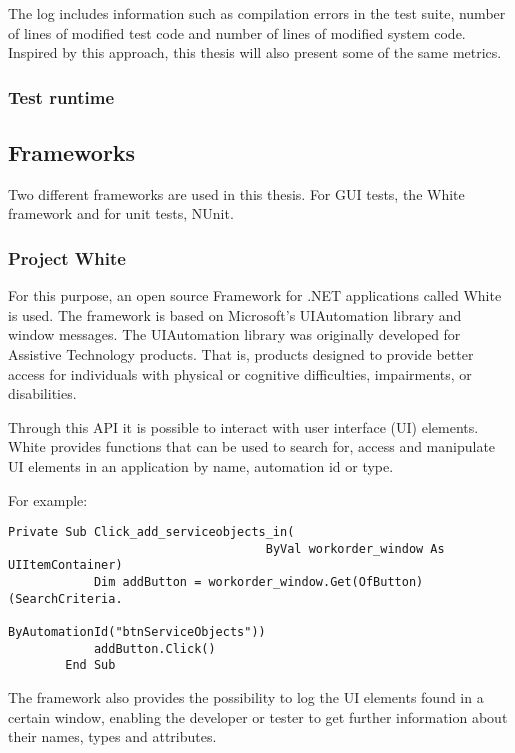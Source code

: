 \documentclass{article}
\begin{document}
			The log includes information such as compilation errors in the test
			suite, number of lines of modified test code and number of lines of modified system code. Inspired by this approach, this thesis will also present some of the same metrics.

			\subsubsection{Test runtime}


		\subsection{Frameworks}

			Two different frameworks are used in this thesis. For GUI tests, the White framework and for unit tests, NUnit. 

			\subsubsection{Project White}
			For this purpose, an open source Framework for .NET applications called White is used. The framework is based on Microsoft's UIAutomation library and window messages. The UIAutomation library was originally developed for Assistive Technology products. That is, products designed to provide better access for individuals with physical or cognitive difficulties, impairments, or disabilities. \cite{white}

			Through this API it is possible to interact with user interface (UI) elements. 
			White provides functions that can be used to search for, access and manipulate UI elements in an application by name, automation id or type. 

			For example:

			\begin{lstlisting}[caption=A method which finds a button with id {\em btnServiceObjects} and clicks on it.]
		Private Sub Click_add_serviceobjects_in(
									ByVal workorder_window As UIItemContainer)
			Dim addButton = workorder_window.Get(OfButton)(SearchCriteria.
												ByAutomationId("btnServiceObjects"))
			addButton.Click()
		End Sub
			\end{lstlisting}
			
			The framework also provides the possibility to log the UI elements found in a certain window, enabling the developer or tester to get further information about their names, types and attributes.
\end{document}

